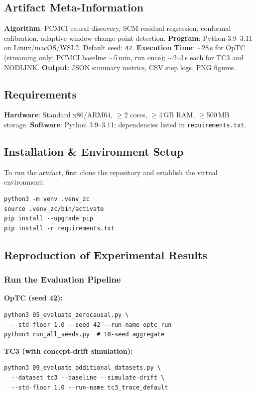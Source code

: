 \subsection{Artifact Meta-Information}
\textbf{Algorithm}: PCMCI causal discovery, SCM residual regression, conformal calibration, adaptive window change-point detection.
\textbf{Program}: Python 3.9--3.11 on Linux/macOS/WSL2. Default seed: \texttt{42}.
\textbf{Execution Time}: $\sim$28\,s for OpTC (streaming only; PCMCI baseline $\sim$5\,min, run once); $\sim$2--3\,s each for TC3 and NODLINK.
\textbf{Output}: JSON summary metrics, CSV step logs, PNG figures.

\subsection{Requirements}
\textbf{Hardware}: Standard x86/ARM64, $\geq$2 cores, $\geq$4\,GB RAM, $\geq$500\,MB storage.
\textbf{Software}: Python 3.9--3.11; dependencies listed in \texttt{requirements.txt}.

\subsection{Installation \& Environment Setup}
To run the artifact, first clone the repository and establish the virtual environment:
\begin{lstlisting}
python3 -m venv .venv_zc
source .venv_zc/bin/activate
pip install --upgrade pip
pip install -r requirements.txt
\end{lstlisting}

\subsection{Reproduction of Experimental Results}

\subsubsection{Run the Evaluation Pipeline}
\textbf{OpTC (seed 42):}
\begin{lstlisting}
python3 05_evaluate_zerocausal.py \
  --std-floor 1.0 --seed 42 --run-name optc_run
python3 run_all_seeds.py  # 10-seed aggregate
\end{lstlisting}

\textbf{TC3 (with concept-drift simulation):}
\begin{lstlisting}
python3 09_evaluate_additional_datasets.py \
  --dataset tc3 --baseline --simulate-drift \
  --std-floor 1.0 --run-name tc3_trace_default
\end{lstlisting}

